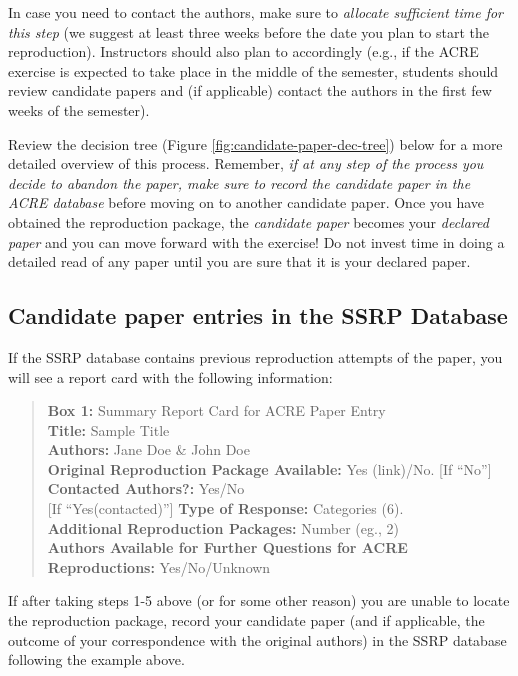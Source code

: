 \documentclass[
]{book}
\begin{document}
In case you need to contact the authors, make sure to \emph{allocate sufficient time for this step} (we suggest at least three weeks before the date you plan to start the reproduction). Instructors should also plan to accordingly (e.g., if the ACRE exercise is expected to take place in the middle of the semester, students should review candidate papers and (if applicable) contact the authors in the first few weeks of the semester).

Review the decision tree (Figure \ref{fig:candidate-paper-dec-tree}) below for a more detailed overview of this process. Remember, \emph{if at any step of the process you decide to abandon the paper, make sure to record the candidate paper in the ACRE database} before moving on to another candidate paper. Once you have obtained the reproduction package, the \emph{candidate paper} becomes your \emph{declared paper} and you can move forward with the exercise! Do not invest time in doing a detailed read of any paper until you are sure that it is your declared paper.

\hypertarget{check-acre}{%
\subsection{Candidate paper entries in the SSRP Database}\label{check-acre}}

If the SSRP database contains previous reproduction attempts of the paper, you will see a report card with the following information:

\begin{quote}
\textbf{Box 1:} Summary Report Card for ACRE Paper Entry\\
\textbf{Title:} Sample Title\\
\textbf{Authors:} Jane Doe \& John Doe\\
\textbf{Original Reproduction Package Available:} Yes (link)/No.
{[}If ``No''{]} \textbf{Contacted Authors?:} Yes/No\\
{[}If ``Yes(contacted)''{]} \textbf{Type of Response:} Categories (6).\\
\textbf{Additional Reproduction Packages:} Number (eg., 2)\\
\textbf{Authors Available for Further Questions for ACRE Reproductions:} Yes/No/Unknown
\end{quote}

If after taking steps 1-5 above (or for some other reason) you are unable to locate the reproduction package, record your candidate paper (and if applicable, the outcome of your correspondence with the original authors) in the SSRP database following the example above.
\end{document}
